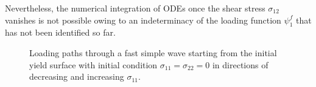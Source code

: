 Nevertheless, the numerical integration of ODEs once the shear stress $\sigma_{12}$ vanishes is not possible owing to an indeterminacy of the loading function $\psi_1^f$ that has not been identified so far.
\begin{figure}[h!]
  \centering
  \caption{Loading paths through a fast simple wave starting from the initial yield surface with initial condition $\sigma_{11}=\sigma_{22}=0$ in directions of decreasing and increasing $\sigma_{11}$.}
  \label{fig:fast_path_plane_stress}
\end{figure}

